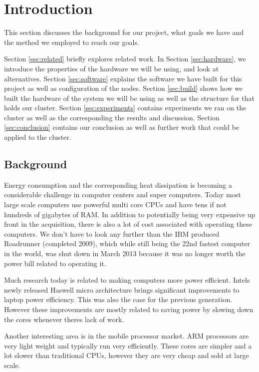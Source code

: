\clearpage
\section{Introduction}
\label{sec:introduction}

This section discusses the background for our project, what goals we have and the method we employed to reach our goals.

Section \ref{sec:related} briefly explores related work.
In Section \ref{sec:hardware}, we introduce the properties of the hardware we will be using, and look at alternatives.
Section \ref{sec:software} explains the software we have built for this project as well as configuration of the nodes.
Section \ref{sec:build} shows how we built the hardware of the system we will be using as well as the structure for that holds our cluster.
Section \ref{sec:experiments} contains experiments we ran on the cluster as well as the corresponding the results and discussion.
Section \ref{sec:conclusion} contains our conclusion as well as further work that could be applied to the cluster.

\subsection{Background}
Energy consumption and the corresponding heat dissipation is becoming a considerable challenge in computer centers and super computers. Today most large scale computers use powerful multi core CPUs and have tens if not hundreds of gigabytes of RAM. In addition to potentially being very expensive up front in the acquisition, there is also a lot of cost associated with operating these computers. We don't have to look any further than the IBM produced Roadrunner (completed 2009), which while still being the 22nd fastest computer in the world, was shut down in March 2013 because it was no longer worth the power bill related to operating it.\cite{roadrunner}

Much research today is related to making computers more power efficient. Intels newly released Haswell micro architecture brings significant improvements to laptop power efficiency. This was also the case for the previous generation. However these improvements are mostly related to saving power by slowing down the cores whenever theres lack of work.

Another interesting area is in the mobile processor market. ARM processors are very light weight and typically run very efficiently. These cores are simpler and a lot slower than traditional CPUs, however they are very cheap and sold at large scale. 


